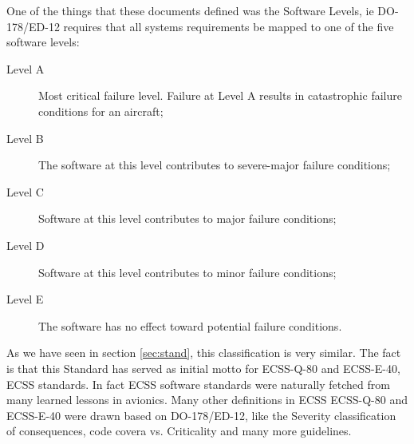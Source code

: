 {One of the things that these documents defined was the Software Levels\cite{citeulike:4106419}, ie DO-178/ED-12 requires that all systems requirements be mapped
to one of the five software levels:
\begin{description}
\item[Level A] Most critical failure level. Failure at Level A results in catastrophic failure conditions for an aircraft;
\item[Level B] The software at this level contributes to severe-major failure conditions;
\item[Level C] Software at this level contributes to major failure conditions;
\item[Level D] Software at this level contributes to minor failure conditions;
\item[Level E] The software has no effect toward potential failure conditions.
\end{description}
As we have seen in section \ref{sec:stand}, this classification is very similar.
The fact is that this Standard has served as initial motto for ECSS-Q-80\cite{ecss-q-st-80c} and ECSS-E-40\cite{ecss-e-st-40c}, \ac{ECSS} standards.
In fact \ac{ECSS} software standards were naturally fetched from many learned lessons in avionics.
Many other definitions in \ac{ECSS} ECSS-Q-80\cite{ecss-q-st-80c} and ECSS-E-40\cite{ecss-e-st-40c} were drawn based on DO-178/ED-12, like the
Severity classification of consequences, code covera vs. Criticality and many more guidelines.

}
